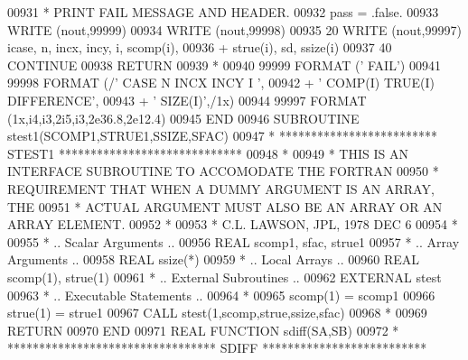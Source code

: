 \begin{DoxyCode}
00931 \textcolor{comment}{*                             PRINT FAIL MESSAGE AND HEADER.}
00932          pass = .false.
00933          \textcolor{keyword}{WRITE} (nout,99999)
00934          \textcolor{keyword}{WRITE} (nout,99998)
00935    20    \textcolor{keyword}{WRITE} (nout,99997) icase, n, incx, incy, i, scomp(i),
00936      +     strue(i), sd, ssize(i)
00937    40 \textcolor{keywordflow}{CONTINUE}
00938       \textcolor{keywordflow}{RETURN}
00939 \textcolor{comment}{*}
00940 99999 \textcolor{keyword}{FORMAT} (\textcolor{stringliteral}{'                                       FAIL'})
00941 99998 \textcolor{keyword}{FORMAT} (/\textcolor{stringliteral}{' CASE  N INCX INCY  I                            '},
00942      +       \textcolor{stringliteral}{' COMP(I)                             TRUE(I)  DIFFERENCE'},
00943      +       \textcolor{stringliteral}{'     SIZE(I)'},/1x)
00944 99997 \textcolor{keyword}{FORMAT} (1x,i4,i3,2i5,i3,2e36.8,2e12.4)
00945 \textcolor{keyword}{      END}
00946 \textcolor{keyword}{      SUBROUTINE }stest1(SCOMP1,STRUE1,SSIZE,SFAC)
00947 \textcolor{comment}{*     ************************* STEST1 *****************************}
00948 \textcolor{comment}{*}
00949 \textcolor{comment}{*     THIS IS AN INTERFACE SUBROUTINE TO ACCOMODATE THE FORTRAN}
00950 \textcolor{comment}{*     REQUIREMENT THAT WHEN A DUMMY ARGUMENT IS AN ARRAY, THE}
00951 \textcolor{comment}{*     ACTUAL ARGUMENT MUST ALSO BE AN ARRAY OR AN ARRAY ELEMENT.}
00952 \textcolor{comment}{*}
00953 \textcolor{comment}{*     C.L. LAWSON, JPL, 1978 DEC 6}
00954 \textcolor{comment}{*}
00955 \textcolor{comment}{*     .. Scalar Arguments ..}
00956       \textcolor{keywordtype}{REAL}              scomp1, sfac, strue1
00957 \textcolor{comment}{*     .. Array Arguments ..}
00958       \textcolor{keywordtype}{REAL}              ssize(*)
00959 \textcolor{comment}{*     .. Local Arrays ..}
00960       \textcolor{keywordtype}{REAL}              scomp(1), strue(1)
00961 \textcolor{comment}{*     .. External Subroutines ..}
00962       \textcolor{keywordtype}{EXTERNAL}          stest
00963 \textcolor{comment}{*     .. Executable Statements ..}
00964 \textcolor{comment}{*}
00965       scomp(1) = scomp1
00966       strue(1) = strue1
00967       \textcolor{keyword}{CALL }stest(1,scomp,strue,ssize,sfac)
00968 \textcolor{comment}{*}
00969       \textcolor{keywordflow}{RETURN}
00970 \textcolor{keyword}{      END}
00971 \textcolor{keyword}{      REAL             }\textcolor{keyword}{FUNCTION }sdiff(SA,SB)
00972 \textcolor{comment}{*     ********************************* SDIFF **************************}

\end{DoxyCode}
